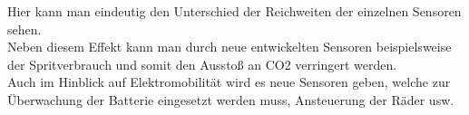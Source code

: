 	\begin{flushleft}
		
		Hier kann man eindeutig den Unterschied der Reichweiten der einzelnen Sensoren sehen.\\
		
		Neben diesem Effekt kann man durch neue entwickelten Sensoren beispielsweise der Spritverbrauch und somit den Ausstoß an CO2 verringert werden.\\
		Auch im Hinblick auf Elektromobilität wird es neue Sensoren geben, welche zur Überwachung der Batterie eingesetzt werden muss, Ansteuerung der Räder usw.
		
	\end{flushleft} 
	